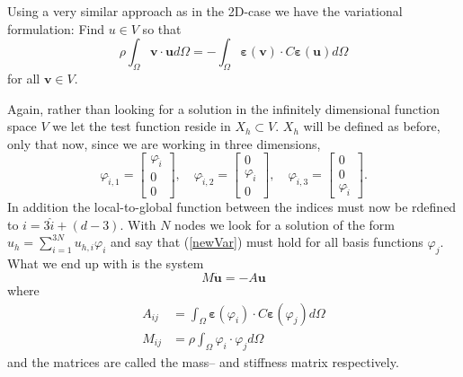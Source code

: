\documentclass[paper=a4, fontsize=11pt]{scrartcl} %
\begin{document}
Using a very similar approach as in the 2D-case we have the variational formulation: Find $u\in V$ so that 
\begin{equation}
\rho \int_{\Omega}\boldsymbol{v}\cdot \boldsymbol{u}d\Omega=
-\int_{\Omega}\boldsymbol{\varepsilon}(\boldsymbol{v})\cdot C\boldsymbol{\varepsilon}(\boldsymbol{u})d\Omega
\label{newVar}
\end{equation}
for all $\boldsymbol{v}\in V$.

Again, rather than looking for a solution in the infinitely dimensional function space $V$ we let the test function reside in $X_h \subset V$. $X_h$ will be defined as before, only that now, since we are working in three dimensions,
\begin{equation*}
\varphi_{\hat{i},1} = \begin{bmatrix}
\varphi_{\hat{i}} \\ 0 \\ 0
\end{bmatrix}, \quad
\varphi_{\hat{i},2} = \begin{bmatrix}
 0 \\ \varphi_{\hat{i}}\\ 0
\end{bmatrix}, \quad
\varphi_{\hat{i},3} = \begin{bmatrix}
0 \\ 0 \\ \varphi_{\hat{i}}
\end{bmatrix}.
\end{equation*}
In addition the local-to-global function between the indices must now be rdefined to $i = 3\hat{i}+(d-3)$. With $N$ nodes we look for a solution of the form $u_h = \sum_{i=1}^{3N}u_{h,i}\varphi_i$ and say that (\ref{newVar}) must hold for all basis functions $\varphi_j$. What we end up with is the system
\begin{equation}
M\ddot{\boldsymbol{u}} = -A\boldsymbol{u}
\end{equation}
where
\begin{align*}
A_{ij} &= \int_\Omega \boldsymbol{\varepsilon}(\varphi_i)\cdot C\boldsymbol{\varepsilon}(\varphi_j)d\Omega  \\
M_{ij} &= \rho \int_{\Omega}\varphi_i \cdot \varphi_j d\Omega
\end{align*}
and the matrices are called the mass-- and stiffness matrix respectively.
\end{document}
